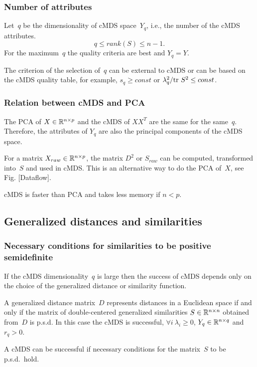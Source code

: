 \documentclass[10pt,a4paper]{article}
\begin{document}
\subsubsection {Number of attributes}

Let~$q$ be the dimensionality of cMDS space~$Y_q$, i.e., the number of the cMDS attributes.
$$q \le rank(S) \le n - 1.$$
For the maximum~$q$ the quality criteria are best and $Y_q = Y$.

The criterion of the selection of~$q$ can be external to cMDS
or can be based on the cMDS quality table, for example, $s_q \ge const$ or $\lambda_q^2 / \mathrm {tr} \  S^2 \le const$.


\subsubsection {Relation between cMDS and PCA}

The PCA of $X \in \mathbb R^{n \times p}$ and the cMDS of $X X^T$ are the same for the same~$q$.
Therefore, the attributes of $Y_q$ are also the principal components of the cMDS space.

For a matrix $X_{raw} \in \mathbb R^{n \times p}$, the matrix $D^2$ or $S_{raw}$ can be computed, transformed into~$S$ and used in cMDS.
This is an alternative way to do the PCA of~$X$, see Fig. [Dataflow].

cMDS is faster than PCA and takes less memory if $n < p$.


\subsection {Generalized distances and similarities}

\subsubsection {Necessary conditions for similarities to be positive semidefinite}

If the cMDS dimensionality~$q$ is large
then the success of cMDS depends only on the choice of the generalized distance or similarity function.

A generalized distance matrix~$D$ represents distances in a Euclidean space
if and only if the matrix of double-centered generalized similarities $S \in \mathbb R^{n \times n}$ obtained from~$D$ is p.s.d.
In this case the cMDS is successful, $\forall i \ \lambda_i \ge 0$, $Y_q \in \mathbb R^{n \times q}$ and $r_q > 0$.

A cMDS can be successful if necessary conditions for the matrix~$S$ to be p.s.d.~hold.
\end{document}
